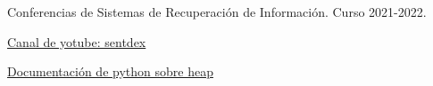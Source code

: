 \documentclass[runningheads]{llncs}
\begin{document}
	\begin{thebibliography}{1}
		\item Conferencias de Sistemas de Recuperaci\'on de Informaci\'on. Curso 2021-2022.
		\item \href{https://m.youtube.com/channel/UCfzlCWGWYyIQ0aLC5w48gBQ}{Canal de yotube: sentdex}
		\item \href{https://docs.python.org/3/library/heapq.html}{Documentaci\'on de python sobre heap}
	\end{thebibliography}
\end{document}
